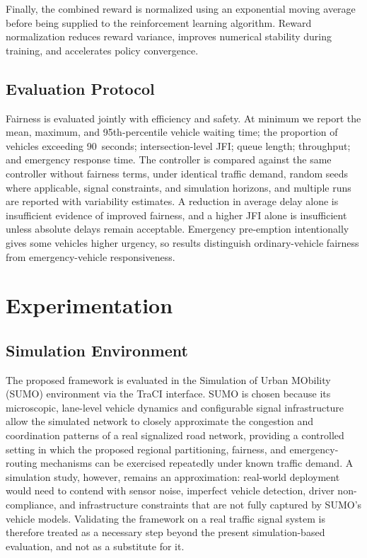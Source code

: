 \documentclass[3p,times]{elsarticle}
\theoremstyle{plain}
\theoremstyle{definition}
\begin{document}
Finally, the combined reward is normalized using an exponential
moving average before being supplied to the reinforcement learning
algorithm. Reward normalization reduces reward variance, improves
numerical stability during training, and accelerates policy
convergence.

\subsection{Evaluation Protocol}

Fairness is evaluated jointly with efficiency and safety. At minimum we report the mean,
maximum, and 95th-percentile vehicle waiting time; the proportion of vehicles exceeding
90~seconds; intersection-level JFI; queue length; throughput; and emergency response time. The
controller is compared against the same controller without fairness terms, under identical
traffic demand, random seeds where applicable, signal constraints, and simulation horizons, and
multiple runs are reported with variability estimates. A reduction in average delay alone is
insufficient evidence of improved fairness, and a higher JFI alone is insufficient unless
absolute delays remain acceptable. Emergency pre-emption intentionally gives some vehicles
higher urgency, so results distinguish ordinary-vehicle fairness from emergency-vehicle
responsiveness.



\section{Experimentation}\label{sec5}

\subsection{Simulation Environment}\label{subsec5-1}

The proposed framework is evaluated in the Simulation of Urban MObility
(SUMO) environment via the TraCI interface. SUMO is chosen because its
microscopic, lane-level vehicle dynamics and configurable signal
infrastructure allow the simulated network to closely approximate the
congestion and coordination patterns of a real signalized road network,
providing a controlled setting in which the proposed regional
partitioning, fairness, and emergency-routing mechanisms can be
exercised repeatedly under known traffic demand. A simulation study,
however, remains an approximation: real-world deployment would need to
contend with sensor noise, imperfect vehicle detection, driver
non-compliance, and infrastructure constraints that are not fully
captured by SUMO's vehicle models. Validating the framework on a real
traffic signal system is therefore treated as a necessary step beyond
the present simulation-based evaluation, and not as a substitute for
it.
\end{document}
